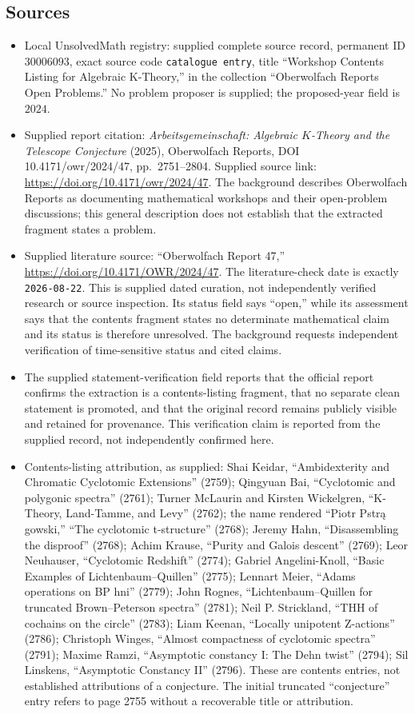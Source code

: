 \documentclass[11pt]{article}
\begin{document}
\subsection{Sources}
\begin{itemize}
\item Local UnsolvedMath registry: supplied complete source record, permanent ID \(30006093\), exact source code \texttt{catalogue entry}, title ``Workshop Contents Listing for Algebraic K-Theory,'' in the collection ``Oberwolfach Reports Open Problems.'' No problem proposer is supplied; the proposed-year field is \(2024\).
\item Supplied report citation: \emph{Arbeitsgemeinschaft: Algebraic \(K\)-Theory and the Telescope Conjecture} (2025), Oberwolfach Reports, DOI 10.4171/owr/2024/47, pp.\ 2751--2804. Supplied source link: \url{https://doi.org/10.4171/owr/2024/47}. The background describes Oberwolfach Reports as documenting mathematical workshops and their open-problem discussions; this general description does not establish that the extracted fragment states a problem.
\item Supplied literature source: ``Oberwolfach Report 47,'' \url{https://doi.org/10.4171/OWR/2024/47}. The literature-check date is exactly \texttt{2026-08-22}. This is supplied dated curation, not independently verified research or source inspection. Its status field says ``open,'' while its assessment says that the contents fragment states no determinate mathematical claim and its status is therefore unresolved. The background requests independent verification of time-sensitive status and cited claims.
\item The supplied statement-verification field reports that the official report confirms the extraction is a contents-listing fragment, that no separate clean statement is promoted, and that the original record remains publicly visible and retained for provenance. This verification claim is reported from the supplied record, not independently confirmed here.
\item Contents-listing attribution, as supplied: Shai Keidar, ``Ambidexterity and Chromatic Cyclotomic Extensions'' (2759); Qingyuan Bai, ``Cyclotomic and polygonic spectra'' (2761); Turner McLaurin and Kirsten Wickelgren, ``K-Theory, Land-Tamme, and Levy'' (2762); the name rendered ``Piotr Pstra\k{ } gowski,'' ``The cyclotomic t-structure'' (2768); Jeremy Hahn, ``Disassembling the disproof'' (2768); Achim Krause, ``Purity and Galois descent'' (2769); Leor Neuhauser, ``Cyclotomic Redshift'' (2774); Gabriel Angelini-Knoll, ``Basic Examples of Lichtenbaum--Quillen'' (2775); Lennart Meier, ``Adams operations on BP hni'' (2779); John Rognes, ``Lichtenbaum--Quillen for truncated Brown--Peterson spectra'' (2781); Neil P. Strickland, ``THH of cochains on the circle'' (2783); Liam Keenan, ``Locally unipotent Z-actions'' (2786); Christoph Winges, ``Almost compactness of cyclotomic spectra'' (2791); Maxime Ramzi, ``Asymptotic constancy I: The Dehn twist'' (2794); Sil Linskens, ``Asymptotic Constancy II'' (2796). These are contents entries, not established attributions of a conjecture. The initial truncated ``conjecture'' entry refers to page 2755 without a recoverable title or attribution.
\end{itemize}
\end{document}
